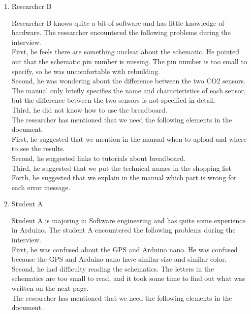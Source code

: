 \documentclass[conference]{IEEEtran}
\begin{document}
\begin{enumerate}
\begin{enumerate}
					\item Researcher B

						Researcher B knows quite a bit of software and has little knowledge of hardware. The researcher encountered the following problems during the interview.\\

						First, he feels there are something unclear about the schematic. 						He pointed out that the schematic pin number is missing. The pin number is too small to specify, so he was uncomfortable with rebuilding.\\
						Second, he was wondering about the difference between the two CO2 sensors. The manual only briefly specifies the name and characteristics of each sensor, but the difference between the two sensors is not specified in detail.\\
						Third, he did not know how to use the breadboard.\\

						The researcher has mentioned that we need the following elements in the document.\\

						First, he suggested that we mention in the manual when to upload and where to see the results. \\
						Second, he suggested links to tutorials about breadboard.\\
						Third, he suggested that we put the technical names in the shopping list\\
						Forth, he suggested that we explain in the manual which part is wrong for each error message.\\

					\item Student A

						Student A is majoring in Software engineering and has  quite some experience in Arduino. The student A encountered the following problems during the interview.\\

						First, he was confused about the GPS and Arduino nano. He was confused because the GPS and Arduino nano have similar size and similar color.\\
						Second, he had difficulty reading the schematics. The letters in the schematics are too small to read, and it took some time to find out what was written on the next page.\\

						The researcher has mentioned that we need the following elements in the document.\\


\end{enumerate}
\end{enumerate}
\end{document}
